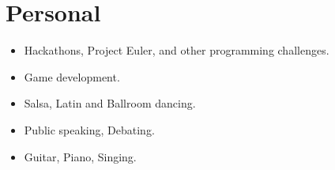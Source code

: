 \documentclass{jcgcv}
\begin{document}
\begin{column}
\section{Personal}

\begin{itemize}
  \item Hackathons, Project Euler, and other programming challenges.
  \item Game development.
  \item Salsa, Latin and Ballroom dancing.
  \item Public speaking, Debating.
  \item Guitar, Piano, Singing.
\end{itemize}


\end{column}
\end{document}
